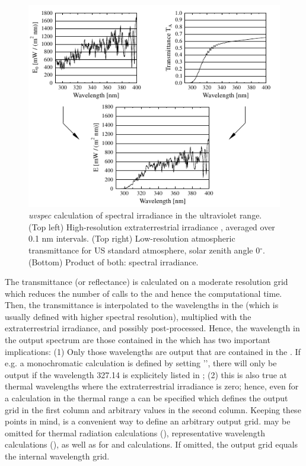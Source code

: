 \begin{figure}[t]
  \centering
  \includegraphics[width=1.\hsize]{figs/transpz.pdf}
  \caption{{\sl uvspec} calculation of spectral irradiance in the
    ultraviolet range. (Top left) High-resolution extraterrestrial irradiance
    \citet{kurucz92}, averaged over 0.1 nm intervals. 
    (Top right) Low-resolution atmospheric
    transmittance for US standard 
    atmosphere, solar zenith angle 0$^\circ$. 
    (Bottom) Product of both: spectral irradiance.}
  \label{fig:transpz}
\end{figure}

The transmittance (or reflectance) is calculated on a moderate
resolution grid which reduces the number of calls to the
 and hence the computational time. Then, the
transmittance is interpolated to the wavelengths in the
 (which is usually defined with higher spectral
resolution), multiplied with the extraterrestrial irradiance, and
possibly post-processed.  Hence, the wavelength in the output spectrum
are those contained in the  which has two important
implications: (1) Only those wavelengths are output that are contained
in the . If e.g. a monochromatic calculation is
defined by setting '', there will only be
output if the wavelength 327.14 is explicitely listed in
; (2) this is also true at thermal wavelengths where
the extraterrestrial irradiance is zero; hence, even for a calculation
in the thermal range a  can be specified which
defines the output grid in the first column and arbitrary values in
the second column. Keeping these points in mind,  is
a convenient way to define an arbitrary output
grid.  may be omitted for thermal radiation
calculations (), representative wavelength 
calculations (), as well as for
 and  calculations. 
If omitted, the output grid equals the internal wavelength grid.

